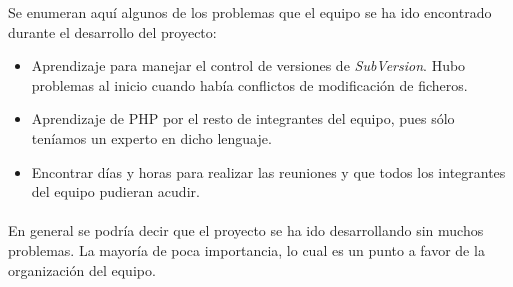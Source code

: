 Se enumeran aquí algunos de los problemas que el equipo se ha ido encontrado durante el desarrollo del proyecto:

\begin{itemize}
	\item Aprendizaje para manejar el control de versiones de \textit{SubVersion}. Hubo problemas al inicio cuando había conflictos de modificación de ficheros.
	\item Aprendizaje de PHP por el resto de integrantes del equipo, pues sólo teníamos un experto en dicho lenguaje.
	\item Encontrar días y horas para realizar las reuniones y que todos los integrantes del equipo pudieran acudir.
\end{itemize}

\paragraph{} En general se podría decir que el proyecto se ha ido desarrollando sin muchos problemas. La mayoría de poca importancia, lo cual es un punto a favor de la organización del equipo.
